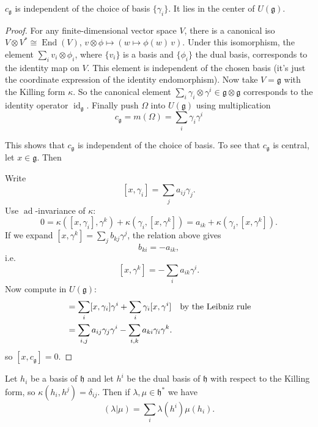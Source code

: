 \documentclass[12pt]{article}
\begin{document}
\begin{proposition}
    $c_{\mathfrak{g}}$ is independent of the choice of basis $\{\gamma_i\}$.
    It lies in the center of $U(\mathfrak{g})$.
\end{proposition}

\begin{proof}
    For any finite-dimensional vector space $V$, there is a canonical iso
    $V \otimes V^* \cong \operatorname{End}(V)$, $v\otimes \phi \mapsto (w \mapsto \phi(w)\,v)$. Under this isomorphism, the element $\sum_i v_i \otimes \phi_i$, where $\{v_i\}$ is a basis and $\{\phi_i\}$ the dual basis, corresponds to the identity map on $V$. This element is independent of the chosen basis (it's just the coordinate expression of the identity endomorphism). Now take $V = \mathfrak{g}$ with the Killing form $\kappa$. So the canonical element $\sum_i \gamma_i \otimes \gamma^i \in \mathfrak{g} \otimes \mathfrak{g}$ corresponds to the identity operator $\operatorname{id}_{\mathfrak{g}}$. Finally push $\Omega$ into $U(\mathfrak{g})$ using multiplication \[c_{\mathfrak{g}} = m(\Omega) = \sum_i \gamma_i \gamma^i\]

    This shows that $c_{\mathfrak{g}}$ is independent of the choice of basis. To see that $c_{\mathfrak{g}}$ is central, let $x \in \mathfrak{g}$. Then

    Write
    \[
        [x, \gamma_i] = \sum_j a_{ij} \gamma_j.
    \]
    Use $\operatorname{ad}$-invariance of $\kappa$:
    \[
        0 = \kappa([x, \gamma_i], \gamma^k) + \kappa(\gamma_i, [x, \gamma^k])
        = a_{ik} + \kappa(\gamma_i, [x, \gamma^k]).
    \]
    If we expand $[x, \gamma^k] = \sum_j b_{kj} \gamma^j$, the relation above gives
    \[
        b_{ki} = -a_{ik},
    \]
    i.e.
    \[
        [x, \gamma^k] = -\sum_i a_{ik} \gamma^i.
    \]
    Now compute in $U(\mathfrak{g})$:
    \begin{align*}
        [x, c_{\mathfrak{g}}]
         & = \sum_i [x, \gamma_i] \gamma^i + \sum_i \gamma_i [x, \gamma^i] \texty{by the Leibniz rule} \\
         & = \sum_{i, j} a_{ij} \gamma_j \gamma^i - \sum_{i, k} a_{ki} \gamma_i \gamma^k.
    \end{align*}
    so $[x, c_{\mathfrak{g}}] = 0$.
\end{proof}

\begin{proposition}
    Let $h_i$ be a basis of $\mathfrak{h}$ and let $h^i$ be the dual basis of $\mathfrak{h}$
    with respect to the Killing form, so $\kappa(h_i, h^j) = \delta_{ij}$.
    Then if $\lambda, \mu \in \mathfrak{h}^*$ we have
    \[
        (\lambda | \mu) = \sum_i \lambda(h^i)\mu(h_i).
    \]
\end{proposition}
\end{document}
